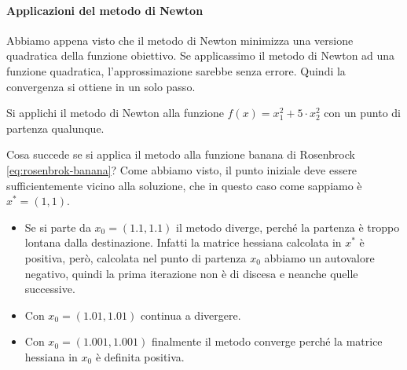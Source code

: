 \paragraph{Applicazioni del metodo di Newton} Abbiamo appena visto che
il metodo di Newton minimizza una versione quadratica della funzione
obiettivo. Se applicassimo il metodo di Newton ad una funzione
quadratica, l'approssimazione sarebbe senza errore. Quindi la
convergenza si ottiene in un solo passo.

\begin{exercise} Si applichi il metodo di Newton alla funzione
$f(x)=x_1^2 + 5\cdot x_2^2$ con un punto di partenza qualunque.
\end{exercise}

\begin{observation} Cosa succede se si applica il metodo alla funzione
banana di Rosenbrock \ref{eq:rosenbrok-banana}? Come abbiamo visto, il
punto iniziale deve essere sufficientemente vicino alla soluzione, che
in questo caso come sappiamo \`e $x^* = (1,1)$.
\begin{itemize}
\item Se si parte da $x_0 = (1.1,1.1)$ il metodo diverge, perch\'e la
partenza \`e troppo lontana dalla destinazione. Infatti la matrice
hessiana calcolata in $x^*$ \`e positiva, però, calcolata nel punto di
partenza $x_0$ abbiamo un autovalore negativo, quindi la prima
iterazione non \`e di discesa e neanche quelle successive.
\item Con $x_0 = (1.01,1.01)$ continua a divergere.
\item Con $x_0 = (1.001,1.001)$ finalmente il metodo converge perch\'e
la matrice hessiana in $x_0$ \`e definita positiva.
\end{itemize}
\end{observation}

\outbpdocument

